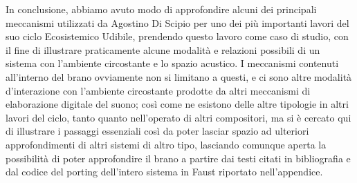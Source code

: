 In conclusione, abbiamo avuto modo di approfondire alcuni dei principali meccanismi 
utilizzati da Agostino Di Scipio per uno dei più importanti lavori del suo ciclo Ecosistemico Udibile,
prendendo questo lavoro come caso di studio, con il fine di illustrare praticamente 
alcune modalità e relazioni possibili 
di un sistema con l'ambiente circostante e lo spazio acustico.
I meccanismi contenuti all'interno del brano ovviamente non si limitano a questi,
e ci sono altre modalità d'interazione con l'ambiente circostante prodotte da altri meccanismi di elaborazione
digitale del suono; così come ne esistono delle altre tipologie in altri lavori del ciclo, tanto quanto 
nell'operato di altri compositori, ma si è cercato qui di illustrare i passaggi 
essenziali così da poter lasciar spazio ad ulteriori approfondimenti di altri sistemi di 
altro tipo, lasciando comunque aperta la possibilità di poter approfondire il brano a partire
dai testi citati in bibliografia e dal codice del porting dell'intero sistema in Faust 
riportato nell'appendice.